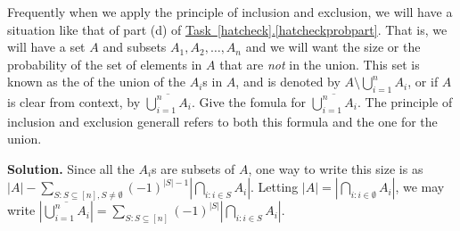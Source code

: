 \documentclass{book}
\begin{document}
\setcounter{project}{224}
\addtocounter{project}{-1}
\begin{activity}[]\label{compunion}
\hypertarget{p-1243}{}%
Frequently when we apply the principle of inclusion and exclusion, we will have a situation like that of part (d) of \hyperref[hatcheckprobpart]{Task~\ref{hatcheck}.\ref{hatcheckprobpart}}.  That is, we will have a set \(A\) and subsets \(A_1, A_2, \ldots, A_n\) and we will want the size or the probability of the set of elements in \(A\) that are \emph{not} in the union.  This set is known as the   of the union of the \(A_i\)s in \(A\), and is denoted by \(A \setminus \bigcup_{i=1}^n A_i\), or if \(A\) is clear from context, by \(\overline{\bigcup_{i=1}^n A_i}\). Give the fomula for \(\overline{\bigcup_{i=1}^n A_i}\).  The principle of inclusion and exclusion generall refers to both this formula and the one for the union.%
\par\smallskip%
\noindent\textbf{Solution.}\hypertarget{solution-145}{}\quad%
\hypertarget{p-1244}{}%
Since all the \(A_i\)s are subsets of \(A\), one way to write this size is as \(|A| - \sum_{S:S \subseteq [n], S \ne \emptyset}(-1)^{|S|-1} |\bigcap_{i:i \in S}A_i|\).  Letting \(|A| = \left|\bigcap_{i:i \in \emptyset} A_i\right|\), we may write \(\left|\overline{\bigcup_{i=1}^n A_i}\right| = \sum_{S:S \subseteq [n]} (-1)^{|S|}\left| \bigcap_{i:i\in S} A_i\right|\).%
\end{activity}
\end{document}
